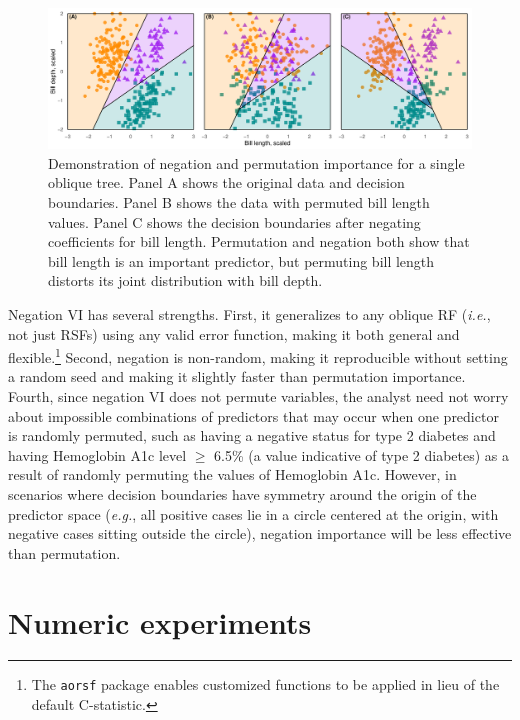 \documentclass[12pt]{article}\usepackage[]{graphicx}\usepackage[]{xcolor}
\makeatletter
\def\maxwidth{ %
  \ifdim\Gin@nat@width>\linewidth
    \linewidth
  \else
    \Gin@nat@width
  \fi
}
\newenvironment{knitrout}{}{} %
\newcommand{\ie}{\textit{i.e.}}
\newcommand{\eg}{\textit{e.g.}}
\makeatother
\begin{document}
\begin{knitrout}
\color{fgcolor}\begin{figure}
\includegraphics[width=\maxwidth]{figure/negation-1} \caption[Demonstration of negation and permutation importance for a single oblique tree]{Demonstration of negation and permutation importance for a single oblique tree. Panel A shows the original data and decision boundaries. Panel B shows the data with permuted bill length values. Panel C shows the decision boundaries after negating coefficients for bill length. Permutation and negation both show that bill length is an important predictor, but permuting bill length distorts its joint distribution with bill depth.}\label{fig:negation}
\end{figure}

\end{knitrout}


Negation VI has several strengths. First, it generalizes to any oblique RF (\ie, not just RSFs) using any valid error function, making it both general and flexible.\footnote{The \texttt{aorsf} package enables customized functions to be applied in lieu of the default C-statistic.} Second, negation is non-random, making it reproducible without setting a random seed and making it slightly faster than permutation importance. Fourth, since negation VI does not permute variables, the analyst need not worry about impossible combinations of predictors that may occur when one predictor is randomly permuted, such as having a negative status for type 2 diabetes and having Hemoglobin A1c level $\geq$ 6.5\% (a value indicative of type 2 diabetes) as a result of randomly permuting the values of Hemoglobin A1c. However, in scenarios where decision boundaries have symmetry around the origin of the predictor space (\eg, all positive cases lie in a circle centered at the origin, with negative cases sitting outside the circle), negation importance will be less effective than permutation.


\section{Numeric experiments} \label{sec:numeric}
\end{document}
